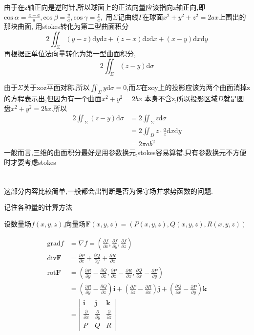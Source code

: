 \documentclass{ctexart}
\begin{document}
由于在z轴正向是逆时针,所以球面上的正法向量应该指向z轴正向,即$\mathrm{cos}\ \alpha=\frac{x-a}{a},\mathrm{cos}\ \beta=\frac{y}{a},\mathrm{cos}\ \gamma=\frac{z}{a},$
用$\Sigma$记曲线$\Gamma$在球面$x^{2}+y^{2}+z^{2}=2ax$上围出的那块曲面,
用stokes转化为第二型曲面积分$$2\iint_{\Sigma}(y-z)\mathrm{d}y\mathrm{d}z+(z-x)\mathrm{d}z\mathrm{d}x+(x-y)\mathrm{d}x\mathrm{d}y$$
再根据正单位法向量转化为第一型曲面积分,$$2\iint_{\Sigma}(z-y)\mathrm{d}\sigma$$

由于$\Sigma$关于xoz平面对称,所以$\iint_{\Sigma}y\mathrm{d}\sigma=0$,而$\Sigma$在xoy上的投影应该为两个曲面消掉z的方程表示出,但因为有一个曲面$x^{2}+y^{2}=2bx$ 本身不含z,所以投影区域$D$就是圆盘$x^{2}+y^{2}=2bx$.所以
\begin{align}
2\iint_{\Sigma}(z-y)\mathrm{d}\sigma&=2\iint_{\Sigma}z\mathrm{d}\sigma\nonumber\\
&=2\iint_{D}z\cdot \frac{a}{z}\mathrm{d}x\mathrm{d}y\nonumber\\
&=2\pi ab^{2}\nonumber
\end{align}
\newline
\newline
一般而言,三维的曲面积分最好是用参数换元,stokes容易算错,只有参数换元不方便时才要考虑stokes
\section{}
这部分内容比较简单,一般都会出判断是否为保守场并求势函数的问题.

记住各种量的计算方法

设数量场$f(x,y,z)$,向量场$\bm{F}(x,y,z)=(P(x,y,z),Q(x,y,z),R(x,y,z))$

\begin{align}
\mathrm{grad}f&=\nabla f=\left(\frac{\partial f}{\partial x},\frac{\partial f}{\partial y},\frac{\partial f}{\partial z}\right)\nonumber\\
\mathrm{div}\bm{F}&=\frac {\partial P}{\partial x}+\frac {\partial Q}{\partial y}+\frac {\partial R}{\partial z}\nonumber\\
\mathrm{rot}\bm{F}&=\left(\frac{\partial R}{\partial y}-\frac{\partial Q}{\partial z},\frac{\partial P}{\partial z}-\frac{\partial R}{\partial x},\frac{\partial Q}{\partial x}-\frac{\partial P}{\partial y}\right)\nonumber\\
&=\left(\frac{\partial R}{\partial y}-\frac{\partial Q}{\partial z}\right)\bm{i}+\left(\frac{\partial P}{\partial z}-\frac{\partial R}{\partial x}\right)\bm{j}+\left(\frac{\partial Q}{\partial x}-\frac{\partial P}{\partial y}\right)\bm{k}\nonumber\\
&=\left|
\begin{array}{ccc}
\bm{i}&\bm{j}&\bm{k}\\
\frac{\partial }{\partial x}&\frac{\partial }{\partial y}&\frac{\partial }{\partial z}\\
P&Q&R
\end{array}
\right|\nonumber
\end{align}
\end{document}
